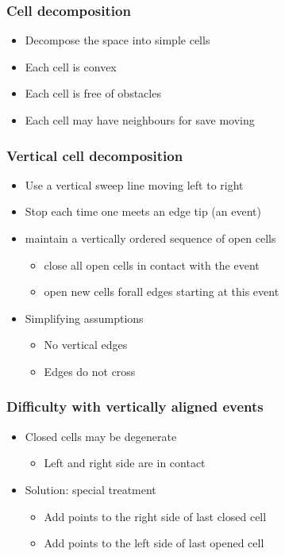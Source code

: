\documentclass[compress]{beamer}
\begin{document}
\begin{frame}
\frametitle{Cell decomposition}
\begin{itemize}
\item Decompose the space into simple cells
\item Each cell is convex
\item Each cell is free of obstacles
\item Each cell may have neighbours for save moving
\end{itemize}
\end{frame}
\begin{frame}
\frametitle{Vertical cell decomposition}
\begin{itemize}
\item Use a vertical sweep line moving left to right
\item Stop each time one meets an edge tip (an event)
\item maintain a vertically ordered sequence of open cells
\begin{itemize}
\item close all open cells in contact with the event
\item open new cells forall edges starting at this event
\end{itemize}
\item Simplifying assumptions
\begin{itemize}
\item No vertical edges
\item Edges do not cross
\end{itemize}
\end{itemize}
\end{frame}
\begin{frame}
\frametitle{Difficulty with vertically aligned events}
\begin{itemize}
\item  Closed cells may be degenerate
\begin{itemize}
\item  Left and right side are in contact
\end{itemize}
\item Solution: special treatment
\begin{itemize}
\item Add points to the right side of last closed cell
\item Add points to the left side of last opened cell
\end{itemize}
\end{itemize}
\end{frame}
\end{document}
